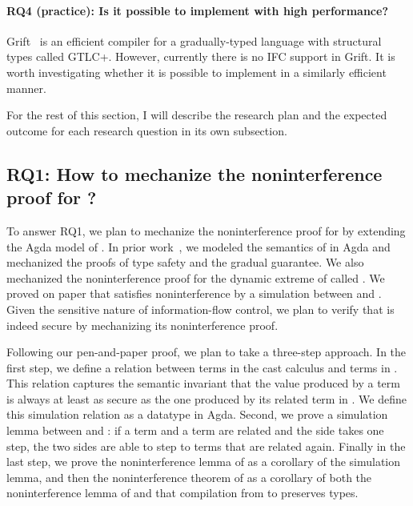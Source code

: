 \paragraph{RQ4 (practice): Is it possible to implement \SurfacePlus with high
  performance?} Grift~\parencite{Kuhlenschmidt:2019aa} is an efficient compiler
for a gradually-typed language with structural types called GTLC+. However,
currently there is no IFC support in Grift. It is worth investigating whether it
is possible to implement \SurfacePlus in a similarly efficient manner.

For the rest of this section, I will describe the research plan and the expected
outcome for each research question in its own subsection.

\subsection{RQ1: How to mechanize the noninterference proof for \Surface?}

To answer RQ1, we plan to mechanize the noninterference proof for
\Surface by extending the Agda model of \Surface. In prior
work~\parencite{chen2024quest}, we modeled the semantics of \Surface in
Agda and mechanized the proofs of type safety and the gradual
guarantee. We also mechanized the noninterference proof for the
dynamic extreme of \Surface called \DynIFC. We proved on paper that
\Surface satisfies noninterference by a simulation between \Surface
and \DynIFC. Given the sensitive nature of information-flow control,
we plan to verify that \Surface is indeed secure by mechanizing its
noninterference proof.

Following our pen-and-paper proof, we plan to take a three-step
approach. In the first step, we define a relation between terms in the
\CC cast calculus and terms in \DynIFC. This relation captures the
semantic invariant that the value produced by a \CC term is always at
least as secure as the one produced by its related term in \DynIFC. We
define this simulation relation as a datatype in Agda. Second, we
prove a simulation lemma between \CC and \DynIFC: if a \CC term and a
\DynIFC term are related and the \CC side takes one step, the two
sides are able to step to terms that are related again. Finally in the
last step, we prove the noninterference lemma of \CC as a corollary of
the simulation lemma, and then the noninterference theorem of \Surface
as a corollary of both the noninterference lemma of \CC and
that compilation from \Surface to \CC preserves types.

